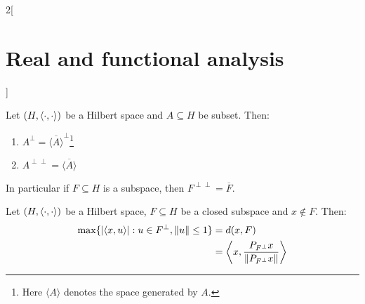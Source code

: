 \documentclass[../../../main_math.tex]{subfiles}
\begin{document}
\begin{multicols}{2}[\section{Real and functional analysis}]
  \begin{proposition}
    Let $(H,{\left\langle\cdot,\cdot\right\rangle})$ be a Hilbert space and $A\subseteq H$ be subset. Then:
    \begin{enumerate}
      \item $\displaystyle A^\perp ={\overline{\langle A\rangle}}^\perp$\footnote{Here $\langle A\rangle$ denotes the space generated by $A$.}
      \item $\displaystyle A^{\perp\perp} ={\overline{\langle A\rangle}}$
    \end{enumerate}
    In particular if $F\subseteq H$ is a subspace, then $F^{\perp\perp} ={\overline{F}}$.
  \end{proposition}
  \begin{proposition}
    Let $(H,{\left\langle\cdot,\cdot\right\rangle})$ be a Hilbert space, $F\subseteq H$ be a closed subspace and $x\notin F$. Then:
    \begin{align*}
      \max\{\abs{{\left\langle x,u\right\rangle}}:u\in F^\perp, \left\|u\right\|\leq 1\} & =d(x, F)                                            \\
                                                             & ={\left\langle x,\frac{P_{F^\perp}x}{\left\|P_{F^\perp}x\right\|}\right\rangle}
    \end{align*}
  \end{proposition}

\end{multicols}
\end{document}
